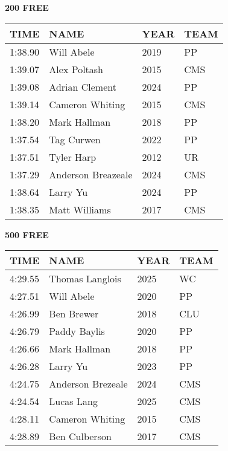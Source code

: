 \begin{table}[H]
\centering
\begin{minipage}[t]{0.48\textwidth}
\centering
\textbf{200 FREE}\\[0.1cm]
\begin{tabular}{@{}p{1.8cm}p{2.8cm}p{1.2cm}p{1.4cm}@{}}
\hline
    \textbf{TIME} & \textbf{NAME} & \textbf{YEAR} & \textbf{TEAM} \\
\hline
    1:38.90 & Will Abele & 2019 & PP \\
    1:39.07 & Alex Poltash & 2015 & CMS \\
    1:39.08 & Adrian Clement & 2024 & PP \\
    1:39.14 & Cameron Whiting & 2015 & CMS \\
    1:38.20 & Mark Hallman & 2018 & PP \\
    1:37.54 & Tag Curwen & 2022 & PP \\
    1:37.51 & Tyler Harp & 2012 & UR \\
    1:37.29 & Anderson Breazeale & 2024 & CMS \\
    1:38.64 & Larry Yu & 2024 & PP \\
    1:38.35 & Matt Williams & 2017 & CMS \\
\hline
\end{tabular}
\end{minipage}\hfill
\begin{minipage}[t]{0.48\textwidth}
\centering
\textbf{500 FREE}\\[0.1cm]
\begin{tabular}{@{}p{1.8cm}p{2.8cm}p{1.2cm}p{1.4cm}@{}}
\hline
    \textbf{TIME} & \textbf{NAME} & \textbf{YEAR} & \textbf{TEAM} \\
\hline
    4:29.55 & Thomas Langlois & 2025 & WC \\
    4:27.51 & Will Abele & 2020 & PP \\
    4:26.99 & Ben Brewer & 2018 & CLU \\
    4:26.79 & Paddy Baylis & 2020 & PP \\
    4:26.66 & Mark Hallman & 2018 & PP \\
    4:26.28 & Larry Yu & 2023 & PP \\
    4:24.75 & Anderson Brezeale & 2024 & CMS \\
    4:24.54 & Lucas Lang & 2025 & CMS \\
    4:28.11 & Cameron Whiting & 2015 & CMS \\
    4:28.89 & Ben Culberson & 2017 & CMS \\
\hline
\end{tabular}
\end{minipage}
\end{table}

